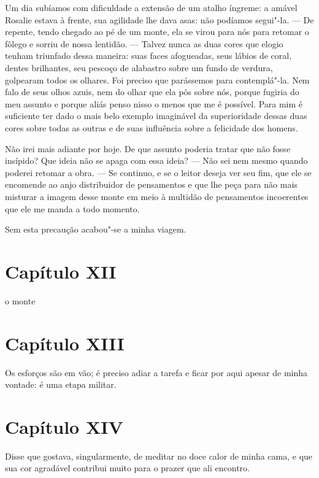  Um dia subíamos com dificuldade a extensão de um atalho íngreme: a
amável Rosalie estava à frente, sua agilidade lhe dava asas: não
podíamos segui"-la. --- De repente, tendo chegado ao pé de um monte, ela
se virou para nós para retomar o fôlego e sorriu de nossa lentidão. ---
Talvez nunca as duas cores que elogio tenham triunfado dessa maneira:
suas faces afogueadas, seus lábios de coral, dentes brilhantes, seu
pescoço de alabastro sobre um fundo de verdura, golpearam todos os
olhares. Foi preciso que parássemos para contemplá"-la. Nem falo de seus
olhos azuis, nem do olhar que ela pôs sobre nós, porque fugiria do meu
assunto e porque aliás penso nisso o menos que me é possível. Para mim
é suficiente ter dado o mais belo exemplo imaginável da superioridade
dessas duas cores sobre todas as outras e de suas influência sobre a
felicidade dos homens.

 Não irei mais adiante por hoje. De que assunto poderia tratar que não
fosse insípido? Que ideia não se apaga com essa ideia? --- Não sei nem
mesmo quando poderei retomar a obra. --- Se continuo, e se o leitor
deseja ver seu fim, que ele se encomende ao anjo distribuidor de
pensamentos e que lhe peça para não mais misturar a imagem desse monte
em meio à multidão de pensamentos incoerentes que ele me manda a todo
momento. 

 Sem esta precaução acabou"-se a minha viagem.

\section*{Capítulo XII}

\noindent\dotfill

\noindent o monte

\noindent\dotfill

\section*{Capítulo XIII}

 Os esforços são em vão; é preciso adiar a tarefa e ficar por aqui
apesar de minha vontade: é uma etapa militar.

\section*{Capítulo XIV}

Disse que gostava, singularmente, de meditar no doce calor de minha
cama, e que sua cor agradável contribui muito para o prazer que ali
encontro.

